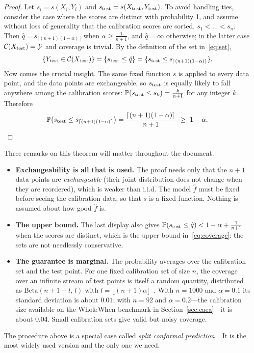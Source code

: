 \documentclass[11pt]{article}
\theoremstyle{definition}
\newcommand{\C}{\mathcal{C}}
\newcommand{\Y}{\mathcal{Y}}
\newcommand{\fhat}{\hat{f}}
\newcommand{\qhat}{\hat{q}}
\newcommand{\Xtest}{X_{\rm test}}
\newcommand{\Ytest}{Y_{\rm test}}
\newcommand{\stest}{s_{\rm test}}
\newcommand{\PP}{\mathbb{P}}
\begin{document}
\begin{proof}
Let $s_i=s(X_i,Y_i)$ and $\stest=s(\Xtest,\Ytest)$. To avoid handling ties, consider the case where the scores are distinct with probability 1, and assume without loss of generality that the calibration scores are sorted, $s_1<\dots<s_n$. Then $\qhat=s_{\lceil(n+1)(1-\alpha)\rceil}$ when $\alpha\ge\frac{1}{n+1}$, and $\qhat=\infty$ otherwise; in the latter case $\C(\Xtest)=\Y$ and coverage is trivial. By the definition of the set in~\eqref{eq:set},
\[\{\Ytest\in\C(\Xtest)\}=\{\stest\le\qhat\}=\{\stest\le s_{\lceil(n+1)(1-\alpha)\rceil}\}.\]
Now comes the crucial insight. The same fixed function $s$ is applied to every data point, and the data points are exchangeable, so $\stest$ is equally likely to fall anywhere among the calibration scores: $\PP(\stest\le s_k)=\frac{k}{n+1}$ for any integer $k$. Therefore
\[\PP\big(\stest\le s_{\lceil(n+1)(1-\alpha)\rceil}\big)=\frac{\lceil(n+1)(1-\alpha)\rceil}{n+1}\ \ge\ 1-\alpha. \qedhere\]
\end{proof}

Three remarks on this theorem will matter throughout the document.
\begin{itemize}[leftmargin=1.5em]
\item \textbf{Exchangeability is all that is used.} The proof needs only that the $n+1$ data points are \emph{exchangeable} (their joint distribution does not change when they are reordered), which is weaker than i.i.d. The model $\fhat$ must be fixed before seeing the calibration data, so that $s$ is a fixed function. Nothing is assumed about how good $\fhat$ is.
\item \textbf{The upper bound.} The last display also gives $\PP(\stest\le\qhat)<1-\alpha+\frac{1}{n+1}$ when the scores are distinct, which is the upper bound in~\eqref{eq:coverage}: the sets are not needlessly conservative.
\item \textbf{The guarantee is marginal.} The probability averages over the calibration set and the test point. For one fixed calibration set of size $n$, the coverage over an infinite stream of test points is itself a random quantity, distributed as $\mathrm{Beta}(n+1-l,\,l)$ with $l=\lfloor(n+1)\alpha\rfloor$~\cite{gentle}. With $n=1000$ and $\alpha=0.1$ its standard deviation is about $0.01$; with $n=92$ and $\alpha=0.2$---the calibration size available on the Who\&When benchmark in Section~\ref{sec:caea}---it is about $0.04$. Small calibration sets give valid but noisy coverage.
\end{itemize}
The procedure above is a special case called \emph{split conformal prediction}~\cite{papadopoulos2002,lei2018}. It is the most widely used version and the only one we need.
\end{document}
